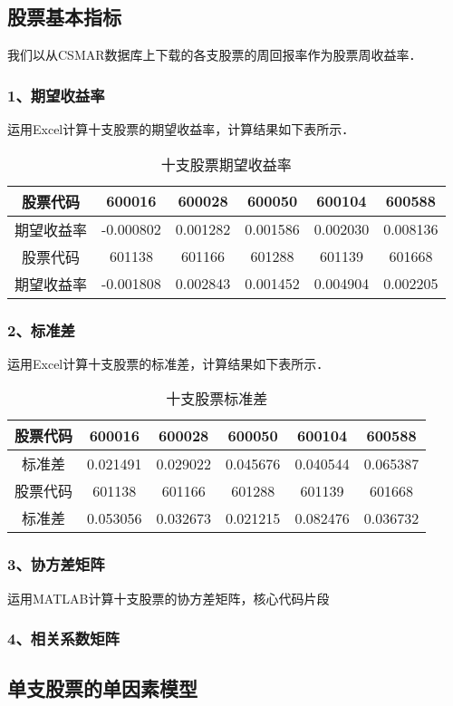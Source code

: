 
\subsection{股票基本指标}
我们以从CSMAR数据库上下载的各支股票的周回报率作为股票周收益率．
\subsubsection{1、期望收益率}
运用Excel计算十支股票的期望收益率，计算结果如下表所示．

\begin{table}[ht]
\centering
\caption{十支股票期望收益率}\label{HW_tab1}
\begin{tabular}{|c|c|c|c|c|c|}
\hline
股票代码 &600016 & 600028 & 600050 & 600104 &	600588 \\
\hline
期望收益率 &-0.000802&0.001282&0.001586&0.002030&0.008136\\
\hline
股票代码 &601138&601166&601288&601139&601668\\
\hline
期望收益率&-0.001808&0.002843&0.001452&0.004904&0.002205\\
\hline
\end{tabular}
\end{table}

\subsubsection{2、标准差}
运用Excel计算十支股票的标准差，计算结果如下表所示．

\begin{table}[ht]
\centering
\caption{十支股票标准差}\label{HW_tab2}
\begin{tabular}{|c|c|c|c|c|c|}
\hline
股票代码 &600016 & 600028 & 600050 & 600104 &	600588 \\
\hline
标准差 &0.021491&0.029022&0.045676&0.040544	&0.065387\\
\hline
股票代码 &601138&601166&601288&601139&601668\\
\hline
标准差&0.053056&0.032673&0.021215&	0.082476&0.036732\\
\hline
\end{tabular}
\end{table}
\subsubsection{3、协方差矩阵}
运用MATLAB计算十支股票的协方差矩阵，核心代码片段
\subsubsection{4、相关系数矩阵}

\subsection{单支股票的单因素模型}
